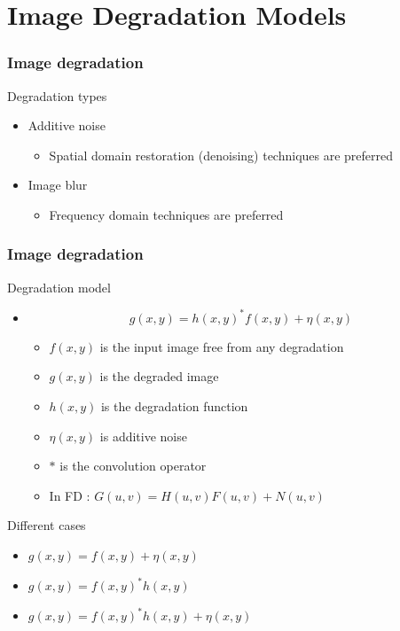 \documentclass{beamer}
\begin{document}
\section{Image Degradation Models}
\begin{frame}
\frametitle{Image degradation}
\begin{block}{Degradation types}
\begin{itemize}
	\item Additive noise	
	\begin{itemize}
		\item Spatial domain restoration (denoising) techniques are preferred 
	\end{itemize}	 
	\item Image blur
	\begin{itemize}
		\item Frequency domain techniques are preferred 
	\end{itemize}
		  
\end{itemize}
\end{block}
\end{frame}
\begin{frame}
\frametitle{Image degradation}
\begin{block}{Degradation model}
\begin{itemize}
	\item [] $$g(x,y) = h(x,y)^\ast f(x,y)+\eta(x,y)$$ 
	\begin{itemize}
		\item $f(x,y)$ is the input image free from any degradation
		\item $g(x,y)$ is the degraded image
		\item $h(x,y)$ is the degradation function
		\item $\eta(x,y)$ is additive noise 
		\item $\ast$ is the convolution operator 
		\item In FD : $G(u,v) = H(u,v)F(u,v)+N(u,v)$ 
	\end{itemize}	 	  
\end{itemize}
\end{block}
\begin{block}{Different cases}
\scriptsize{
\begin{itemize}
\item[]$g(x,y)=f(x,y)+\eta(x,y)$
\item[]$g(x,y)=f(x,y)^\ast h(x,y)$
\item[]$g(x,y)= f(x,y)^\ast h(x,y)+ \eta(x,y)$
\end{itemize}
}
\end{block}
\end{frame}
\end{document}
